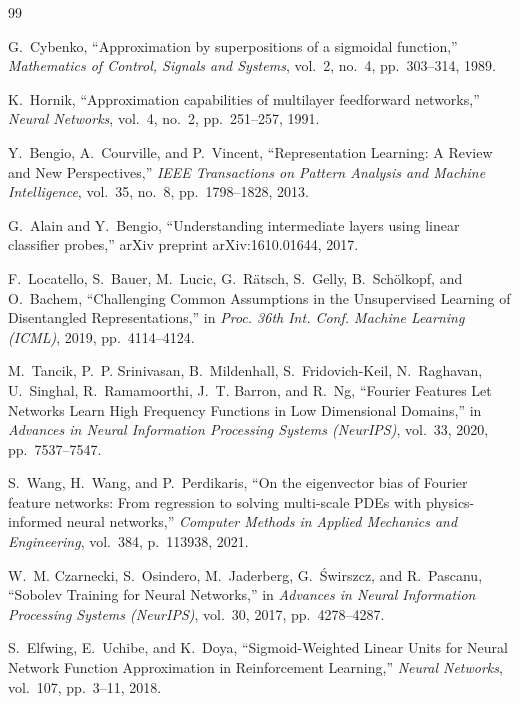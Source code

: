 \documentclass[10pt,journal,compsoc]{IEEEtran}
\begin{document}
\begin{thebibliography}{99}

G.~Cybenko, ``Approximation by superpositions of a sigmoidal function,''
\emph{Mathematics of Control, Signals and Systems}, vol.~2, no.~4,
pp.~303--314, 1989.

K.~Hornik, ``Approximation capabilities of multilayer feedforward
networks,'' \emph{Neural Networks}, vol.~4, no.~2, pp.~251--257, 1991.

Y.~Bengio, A.~Courville, and P.~Vincent, ``Representation Learning: A
Review and New Perspectives,'' \emph{IEEE Transactions on Pattern Analysis
and Machine Intelligence}, vol.~35, no.~8, pp.~1798--1828, 2013.

G.~Alain and Y.~Bengio, ``Understanding intermediate layers using linear
classifier probes,'' arXiv preprint arXiv:1610.01644, 2017.

F.~Locatello, S.~Bauer, M.~Lucic, G.~R\"atsch, S.~Gelly, B.~Sch\"olkopf,
and O.~Bachem, ``Challenging Common Assumptions in the Unsupervised
Learning of Disentangled Representations,'' in \emph{Proc. 36th Int. Conf.
Machine Learning (ICML)}, 2019, pp.~4114--4124.

M.~Tancik, P.~P. Srinivasan, B.~Mildenhall, S.~Fridovich-Keil, N.~Raghavan,
U.~Singhal, R.~Ramamoorthi, J.~T. Barron, and R.~Ng, ``Fourier Features Let
Networks Learn High Frequency Functions in Low Dimensional Domains,''
in \emph{Advances in Neural Information Processing Systems (NeurIPS)},
vol.~33, 2020, pp.~7537--7547.

S.~Wang, H.~Wang, and P.~Perdikaris, ``On the eigenvector bias of Fourier
feature networks: From regression to solving multi-scale PDEs with
physics-informed neural networks,'' \emph{Computer Methods in Applied
Mechanics and Engineering}, vol.~384, p.~113938, 2021.

W.~M. Czarnecki, S.~Osindero, M.~Jaderberg, G.~\'{S}wirszcz, and
R.~Pascanu, ``Sobolev Training for Neural Networks,'' in \emph{Advances
in Neural Information Processing Systems (NeurIPS)}, vol.~30, 2017,
pp.~4278--4287.


S.~Elfwing, E.~Uchibe, and K.~Doya, ``Sigmoid-Weighted Linear Units
for Neural Network Function Approximation in Reinforcement
Learning,'' \emph{Neural Networks}, vol.~107, pp.~3--11, 2018.


\end{thebibliography}
\end{document}

